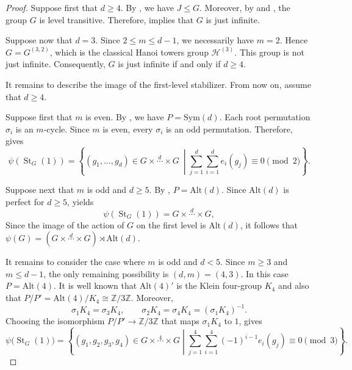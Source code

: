 \documentclass[11pt,leqno]{amsart}
\theoremstyle{plain}
\DeclareMathOperator{\St}{St}
\newcommand{\alt}{\mathrm{Alt}}
\newcommand{\Sym}{\mathrm{Sym}}
\newcommand{\fc}[1]{\textcolor{teal}{#1}}
\numberwithin{equation}{section}
\begin{document}
\begin{proof}
Suppose first that $d\geq 4$. By , we have $J\leq G$. Moreover, by  and , the group $G$ is level transitive. Therefore,  implies that $G$ is just infinite.

Suppose now that $d=3$. Since $2\leq m\leq d-1$, we necessarily have $m=2$. Hence $G=G^{(3,2)}$, which is the classical Hanoi towers group $\mathcal{H}^{(3)}$. This group is not just infinite. Consequently, $G$ is just infinite if and only if $d\geq 4$.

It remains to describe the image of the first-level stabilizer. From now on, assume that $d\geq 4$.

Suppose first that $m$ is even. By , we have $	P=\Sym(d)$. Each root permutation $\sigma_i$ is an $m$-cycle. Since $m$ is even, every $\sigma_i$ is an odd permutation. Therefore,  gives
\[
\psi(\St_G(1))=
\left\{
(g_1,\ldots,g_d)\in G\times \stackrel{d}{\cdots}\times G\ \middle|
\sum_{j=1}^d\sum_{i=1}^d e_i(g_j)\equiv 0 \pmod 2
\right\}.
\]

Suppose next that $m$ is odd and $d\geq 5$. By , $P=\alt(d)$. Since $\alt(d)$ is perfect for $d\geq 5$,  yields
\[
	\psi(\St_G(1))=G\times\stackrel{d}{\cdots}\times G,
\]
Since the image of the action of $G$ on the first level is $\alt(d)$, it follows that $\psi(G)= (G\times \stackrel{d}{\cdots}\times G)\rtimes\alt(d)$.

It remains to consider the case where $m$ is odd and $d<5$. Since $m\geq 3$ and $m\leq d-1$, the only remaining possibility is $(d,m)=(4,3)$. In this case $P=\alt(4)$. It is well known that $\alt(4)'$  is the Klein four-group $K_4$ and also that $P/P'=\alt(4)/K_4\cong \mathbb{Z}/3\mathbb{Z}$. Moreover,
\[
\sigma_1K_4=\sigma_3K_4,
\qquad
\sigma_2K_4=\sigma_4K_4=(\sigma_1K_4)^{-1}.
\]
Choosing the isomorphism $P/P'\to\mathbb{Z}/3\mathbb{Z}$ that maps
$\sigma_1K_4$ to $1$,  gives
\[
\psi\bigl(\St_G(1)\bigr)=
	\left\{
	(g_1,g_2,g_3,g_4)\in G\times \stackrel{4}{\cdots}\times G  \middle|
	\sum_{j=1}^{4}\sum_{i=1}^{4}(-1)^{i-1}e_i(g_j)\equiv 0 \pmod{3}
	\right\}.
\]
\end{proof}




\end{document}
